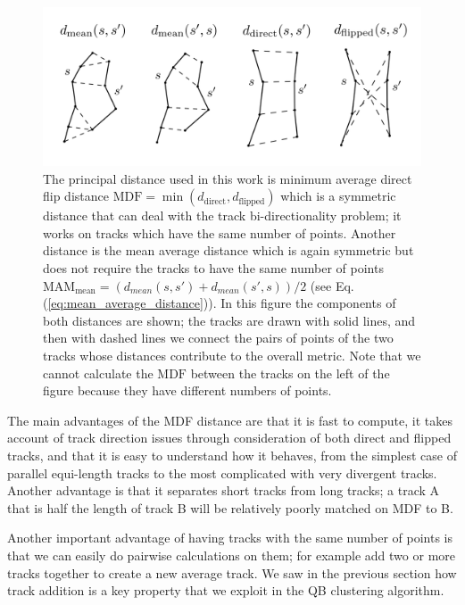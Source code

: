 \documentclass[preprint,authoryear,a4paper,10pt,onecolumn]{elsarticle}
\begin{document}
\begin{figure}
\includegraphics[scale=0.5]{distances2}
\centering{}
\caption{The principal distance used in this work is minimum average direct flip
distance $\textrm{MDF}=\min(d_{\textrm{direct}},d_{\textrm{flipped}})$ which is
a symmetric distance that can deal with the track bi-directionality problem; it
works on tracks which have the same number of points.  Another distance is the
mean average distance which is again symmetric but does not require the tracks
to have the same number of points
$\textrm{MAM}_{\textrm{mean}}=(d_{mean}(s,s')+d_{mean}(s',s))/2$ (see Eq.
(\ref{eq:mean_average_distance})).  In this figure the components of both
distances are shown; the tracks are drawn with solid lines, and then with dashed
lines we connect the pairs of points of the two tracks whose distances
contribute to the overall metric. Note that we cannot calculate the
$\textrm{MDF}$ between the tracks on the left of the figure because they have
different numbers of points.
\label{Flo:Distances_used}}
\end{figure}

The main advantages of the MDF distance are that it is fast to compute,
it takes account of track direction issues through consideration of both
direct and flipped tracks, and that it is easy to understand how it
behaves, from the simplest case of parallel equi-length tracks to the
most complicated with very divergent tracks. Another advantage is that
it separates short tracks from long tracks; a track A that is half the length of
track B will be relatively poorly matched on MDF to B.  

Another important advantage of having tracks with the same number of points is
that we can easily do pairwise calculations on them; for example add two or more
tracks together to create a new average track. We saw in the previous section
how track addition is a key property that we exploit in the QB clustering
algorithm.
\end{document}
